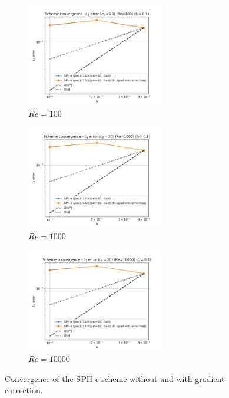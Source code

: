 \begin{figure}[htbp!]
  \begin{subfigure}{7cm}
    \centering\includegraphics[width=6cm]{Code-Figures/mon2017/grad_corr/dt_pois_conv_c0_20_re_100.png}
    \caption{$Re = 100$}
  \end{subfigure}
  \begin{subfigure}{7cm}
    \centering\includegraphics[width=6cm]{Code-Figures/mon2017/grad_corr/dt_pois_conv_c0_20_re_1000.png}
    \caption{$Re = 1000$}
  \end{subfigure}
  \begin{subfigure}{7cm}
    \centering\includegraphics[width=6cm]{Code-Figures/mon2017/grad_corr/dt_pois_conv_c0_20_re_10000.png}
    \caption{$Re = 10000$}
  \end{subfigure}
  \caption{Convergence of the SPH-$\epsilon$ scheme without and with gradient correction.}
  \label{fig:sph-eps-grad-corr}
\end{figure}

